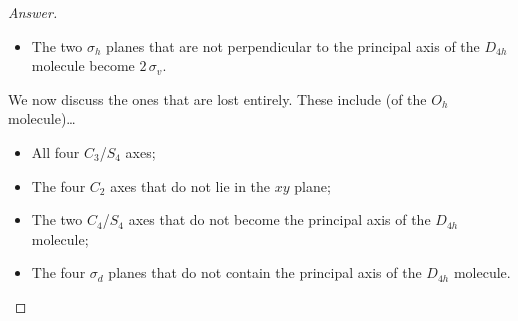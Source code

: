 \documentclass[../psets.tex]{subfiles}
\begin{document}
\begin{enumerate}[label={\Roman*)}]
\begin{proof}[Answer]
\begin{itemize}
            \item The two $\sigma_h$ planes that are not perpendicular to the principal axis of the $D_{4h}$ molecule become $2\,\sigma_v$.
        \end{itemize}
        We now discuss the ones that are lost entirely. These include (of the $O_h$ molecule)\dots
        \begin{itemize}
            \item All four $C_3$/$S_4$ axes;
            \item The four $C_2$ axes that do not lie in the $xy$ plane;
            \item The two $C_4$/$S_4$ axes that do not become the principal axis of the $D_{4h}$ molecule;
            \item The four $\sigma_d$ planes that do not contain the principal axis of the $D_{4h}$ molecule.
        \end{itemize}
    \end{proof}
\end{enumerate}
\end{document}
